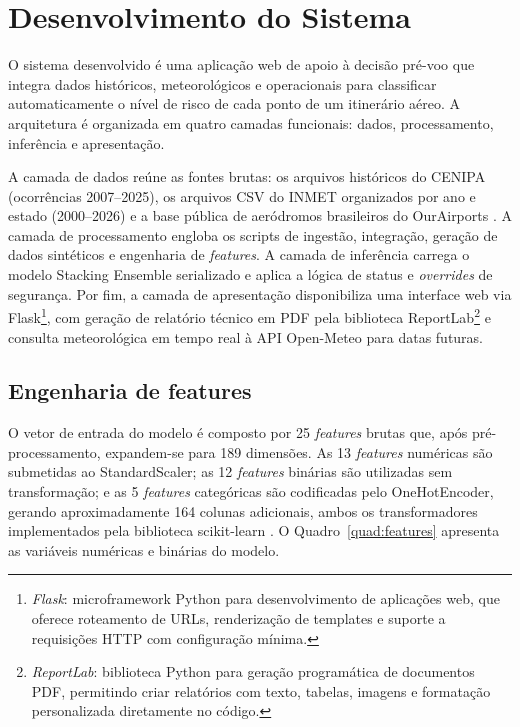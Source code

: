 \documentclass[english,brazilian]{UNISINOSartigo}
\begin{document}
\section{Desenvolvimento do Sistema}

O sistema desenvolvido é uma aplicação web de apoio à decisão pré-voo que
integra dados históricos, meteorológicos e operacionais para classificar
automaticamente o nível de risco de cada ponto de um itinerário aéreo. A
arquitetura é organizada em quatro camadas funcionais: dados,
processamento, inferência e apresentação.

A camada de dados reúne as fontes brutas: os arquivos históricos do CENIPA
\cite{CENIPA2025} (ocorrências 2007--2025), os arquivos CSV do INMET
\cite{INMET2024} organizados por ano e estado (2000--2026) e a base pública de
aeródromos brasileiros do OurAirports \cite{OURAIRPORTS2026}. A camada de processamento engloba os
scripts de ingestão, integração, geração de dados sintéticos e engenharia de
\textit{features}. A camada de inferência carrega o modelo Stacking Ensemble
serializado e aplica a lógica de status e \textit{overrides} de segurança. Por fim,
a camada de apresentação disponibiliza uma interface web via
Flask\footnote{\textit{Flask}: microframework Python para desenvolvimento de
aplicações web, que oferece roteamento de URLs, renderização de templates e
suporte a requisições HTTP com configuração mínima.}, com geração de relatório
técnico em PDF pela biblioteca
ReportLab\footnote{\textit{ReportLab}: biblioteca Python para geração
programática de documentos PDF, permitindo criar relatórios com texto, tabelas,
imagens e formatação personalizada diretamente no código.} e consulta
meteorológica em
tempo real à API Open-Meteo \cite{OPENMETEO2026} para datas futuras.

\subsection{Engenharia de features}

O vetor de entrada do modelo é composto por 25 \textit{features} brutas que, após
pré-processamento, expandem-se para 189 dimensões. As 13 \textit{features}
numéricas são submetidas ao StandardScaler; as 12 \textit{features} binárias são
utilizadas sem transformação; e as 5 \textit{features} categóricas são codificadas
pelo OneHotEncoder, gerando aproximadamente 164 colunas adicionais,
ambos os transformadores implementados pela biblioteca scikit-learn \cite{SCIKITLEARN2026}. O
Quadro~\ref{quad:features} apresenta as variáveis numéricas e binárias do modelo.
\end{document}
